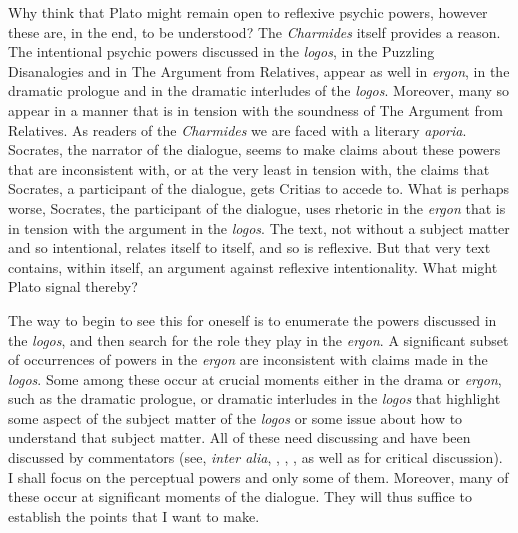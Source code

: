 Why think that Plato might remain open to reflexive psychic powers, however these are, in the end, to be understood? The \emph{Charmides} itself provides a reason. The intentional psychic powers discussed in the \emph{logos}, in the Puzzling Disanalogies and in The Argument from Relatives, appear as well in \emph{ergon}, in the dramatic prologue and in the dramatic interludes of the \emph{logos}. Moreover, many so appear in a manner that is in tension with the soundness of The Argument from Relatives. As readers of the \emph{Charmides} we are faced with a literary \emph{aporia}. Socrates, the narrator of the dialogue, seems to make claims about these powers that are inconsistent with, or at the very least in tension with, the claims that Socrates, a participant of the dialogue, gets Critias to accede to. What is perhaps worse, Socrates, the participant of the dialogue, uses rhetoric in the \emph{ergon} that is in tension with the argument in the \emph{logos}. The text, not without a subject matter and so intentional, relates itself to itself, and so is reflexive. But that very text contains, within itself, an argument against reflexive intentionality. What might Plato signal thereby?

The way to begin to see this for oneself is to enumerate the powers discussed in the \emph{logos}, and then search for the role they play in the \emph{ergon}. A significant subset of occurrences of powers in the \emph{ergon} are inconsistent with claims made in the \emph{logos}. Some among these occur at crucial moments either in the drama or \emph{ergon}, such as the dramatic prologue, or dramatic interludes in the \emph{logos} that highlight some aspect of the subject matter of the \emph{logos} or some issue about how to understand that subject matter. All of these need discussing and have been discussed by commentators (see, \emph{inter alia}, \citealt{Hyland:1981aa}, \citealt{Schmid:1998aa}, \citealt{McCabe:2007ss}, \citealt{Woolf:2023aa} as well as \citealt{Tsouna:2022aa} for critical discussion). I shall focus on the perceptual powers and only some of them. Moreover, many of these occur at significant moments of the dialogue. They will thus suffice to establish the points that I want to make.

